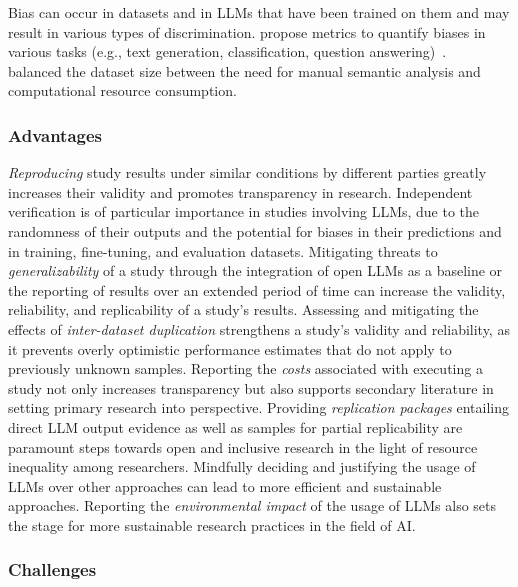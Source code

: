 Bias can occur in datasets and in LLMs that have been trained on them and may result in various types of discrimination.
\citeauthor{DBLP:journals/corr/abs-2309-00770} propose metrics to quantify biases in various tasks (e.g., text generation, classification, question answering)~\cite{DBLP:journals/corr/abs-2309-00770}.
\citeauthor{tinnessoftware}~\cite{tinnessoftware} balanced the dataset size between the need for manual semantic analysis and computational resource consumption.

\subsubsection{Advantages}

\emph{Reproducing} study results under similar conditions by different parties greatly increases their validity and promotes transparency in research.
Independent verification is of particular importance in studies involving LLMs, due to the randomness of their outputs and the potential for biases in their predictions and in training, fine-tuning, and evaluation datasets.
Mitigating threats to \emph{generalizability} of a study through the integration of open LLMs as a baseline or the reporting of results over an extended period of time can increase the validity, reliability, and replicability of a study's results.
Assessing and mitigating the effects of \emph{inter-dataset duplication} strengthens a study's validity and reliability, as it prevents overly optimistic performance estimates that do not apply to previously unknown samples.
Reporting the \emph{costs} associated with executing a study not only increases transparency but also supports secondary literature in setting primary research into perspective.
Providing \emph{replication packages} entailing direct LLM output evidence as well as samples for partial replicability are paramount steps towards open and inclusive research in the light of resource inequality among researchers.
Mindfully deciding and justifying the usage of LLMs over other approaches can lead to more efficient and sustainable approaches. 
Reporting the \emph{environmental impact} of the usage of LLMs also sets the stage for more sustainable research practices in the field of AI.

\subsubsection{Challenges}

